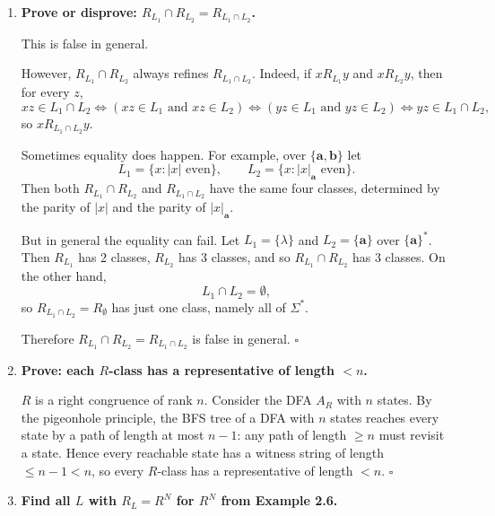 \begin{enumerate}[{2.}1.]
Thus $x R_K y\Rightarrow x=y$, and the converse is trivial. Therefore $R_K$ is the identity relation on $\{\mathbf{0},\mathbf{1}\}^*$.

So
\[
[\mathbf{110}]_{R_K}=\{\mathbf{110}\}.
\]

\item \textbf{Prove or disprove: $R_{L_1}\cap R_{L_2}=R_{L_1\cap L_2}$.}

This is false in general.

However, $R_{L_1}\cap R_{L_2}$ always refines $R_{L_1\cap L_2}$. Indeed, if $x R_{L_1} y$ and $x R_{L_2} y$, then for every $z$,
\[
xz\in L_1\cap L_2
\Leftrightarrow (xz\in L_1\text{ and }xz\in L_2)
\Leftrightarrow (yz\in L_1\text{ and }yz\in L_2)
\Leftrightarrow yz\in L_1\cap L_2,
\]
so $x R_{L_1\cap L_2} y$.

Sometimes equality does happen. For example, over $\{\mathbf{a},\mathbf{b}\}$ let
\[
L_1=\{x:|x|\text{ even}\},\qquad L_2=\{x:|x|_\mathbf{a}\text{ even}\}.
\]
Then both $R_{L_1}\cap R_{L_2}$ and $R_{L_1\cap L_2}$ have the same four classes, determined by the parity of $|x|$ and the parity of $|x|_\mathbf{a}$.

But in general the equality can fail. Let $L_1=\{\lambda\}$ and $L_2=\{\mathbf{a}\}$ over $\{\mathbf{a}\}^*$. Then $R_{L_1}$ has 2 classes, $R_{L_2}$ has 3 classes, and so $R_{L_1}\cap R_{L_2}$ has 3 classes. On the other hand,
\[
L_1\cap L_2=\emptyset,
\]
so $R_{L_1\cap L_2}=R_\emptyset$ has just one class, namely all of $\Sigma^*$.

Therefore $R_{L_1}\cap R_{L_2}=R_{L_1\cap L_2}$ is false in general. $\square$

\item \textbf{Prove: each $R$-class has a representative of length $<n$.}

$R$ is a right congruence of rank $n$. Consider the DFA $A_R$ with $n$ states. By the pigeonhole principle, the BFS tree of a DFA with $n$ states reaches every state by a path of length at most $n-1$: any path of length $\geq n$ must revisit a state. Hence every reachable state has a witness string of length $\leq n-1<n$, so every $R$-class has a representative of length $<n$. $\square$

\item \textbf{Find all $L$ with $R_L=R^N$ for $R^N$ from Example 2.6.}


\end{enumerate}
